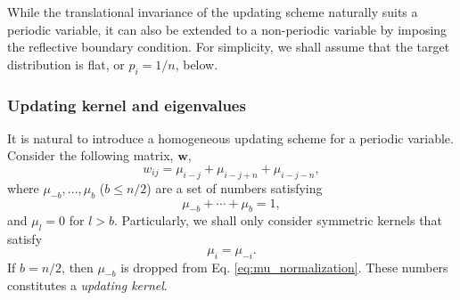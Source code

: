 \documentclass[reprint, floatfix]{revtex4-1}
\begin{document}
While the translational invariance of
the updating scheme
naturally suits a periodic variable\cite{dama2014},
it can also be extended to a non-periodic variable
by imposing the reflective boundary condition.
%
For simplicity, we shall assume that the target
distribution is flat, or $p_i = 1/n$, below.



\subsubsection{\label{sec:bandkernel}
Updating kernel and eigenvalues}



It is natural to introduce a homogeneous updating scheme
for a periodic variable\cite{dama2014}.
%
Consider the following matrix, $\mathbf w$,
%
\begin{equation}
  w_{ij}
  =
  \mu_{i-j}
  +
  \mu_{i-j+n}
  +
  \mu_{i-j-n}
  ,
\label{eq:w_band_pbc}
\end{equation}
%
where
$\mu_{-b}, \dots, \mu_b$ ($b \le n/2$)
are a set of numbers satisfying
%
\begin{equation}
  \mu_{-b} + \cdots + \mu_b = 1
  ,
\label{eq:mu_normalization}
\end{equation}
%
and $\mu_l = 0$ for $l > b$.
%
Particularly,
we shall only consider symmetric kernels
that satisfy
%
\begin{equation}
  \mu_i = \mu_{-i}
  .
\label{eq:mu_symm}
\end{equation}
%
If $b = n/2$, then $\mu_{-b}$ is dropped
from Eq. \eqref{eq:mu_normalization}.
%
These numbers constitutes a \emph{updating kernel}.
\end{document}
